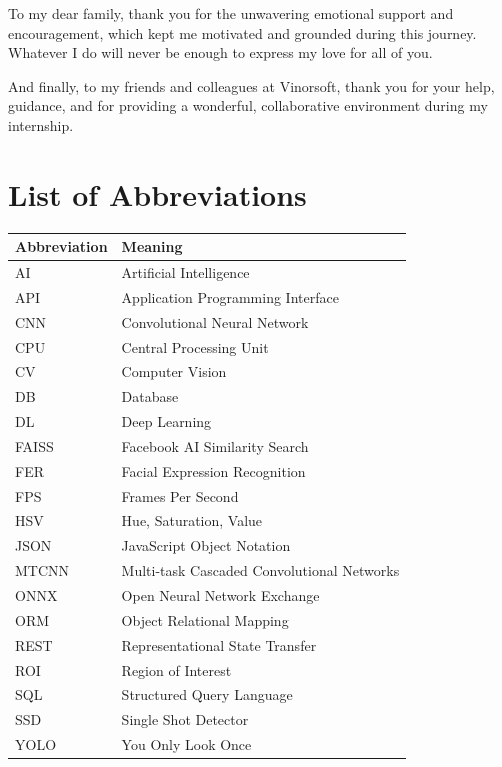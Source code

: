 \documentclass[12pt,a4paper]{report}
\begin{document}
To my dear family, thank you for the unwavering emotional support and encouragement, which kept me motivated and grounded during this journey. Whatever I do will never be enough to express my love for all of you.

And finally, to my friends and colleagues at Vinorsoft, thank you for your help, guidance, and for providing a wonderful, collaborative environment during my internship.

\clearpage

\chapter*{List of Abbreviations}
\begin{longtable}{p{3.5cm}p{10.5cm}}
\toprule
\textbf{Abbreviation} & \textbf{Meaning} \\
\midrule
AI & Artificial Intelligence \\
API & Application Programming Interface \\
CNN & Convolutional Neural Network \\
CPU & Central Processing Unit \\
CV & Computer Vision \\
DB & Database \\
DL & Deep Learning \\
FAISS & Facebook AI Similarity Search \\
FER & Facial Expression Recognition \\
FPS & Frames Per Second \\
HSV & Hue, Saturation, Value \\
JSON & JavaScript Object Notation \\
MTCNN & Multi-task Cascaded Convolutional Networks \\
ONNX & Open Neural Network Exchange \\
ORM & Object Relational Mapping \\
REST & Representational State Transfer \\
ROI & Region of Interest \\
SQL & Structured Query Language \\
SSD & Single Shot Detector \\
YOLO & You Only Look Once \\
\bottomrule
\end{longtable}

\clearpage

\tableofcontents
\clearpage
\listoffigures
\clearpage
\listoftables
\clearpage









\clearpage
{}



\clearpage
\appendix

\end{document}
